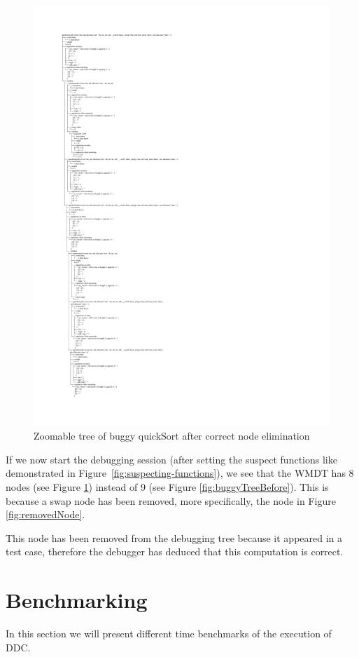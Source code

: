 \begin{figure}
\centering
    \caption{Zoomable tree of buggy quickSort after correct node elimination}
    \label{fig:treeAfterRemoval}
\includegraphics[width=\textwidth,height=\textheight,keepaspectratio]{Imagenes/Vectorial/buggySwapRemoved.pdf}
\end{figure}
If we now start the debugging session (after setting the suspect functions like demonstrated in Figure~\ref{fig:suspecting-functions}), we see that the WMDT has 8 nodes (see Figure \ref{fig:treeAfterRemoval}) instead of 9 (see Figure \ref{fig:buggyTreeBefore}). This is because a swap node has been removed, more specifically, the node in Figure \ref{fig:removedNode}.

This node has been removed from the debugging tree because it appeared in a test case, therefore the debugger has deduced that this computation is correct.
\section{Benchmarking}
In this section we will present different time benchmarks of the execution of DDC.

